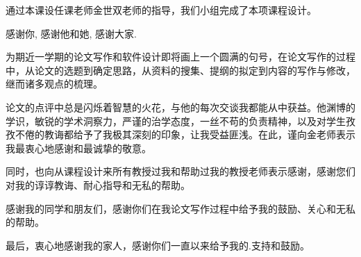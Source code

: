 
\acknowledgement
{}

通过本课设任课老师金世双老师的指导，我们小组完成了本项课程设计。

感谢你, 感谢他和她, 感谢大家.

为期近一学期的论文写作和软件设计即将画上一个圆满的句号，在论文写作的过程中，从论文的选题到确定思路，从资料的搜集、提纲的拟定到内容的写作与修改，继而诸多观点的梳理。

论文的点评中总是闪烁着智慧的火花，与他的每次交谈我都能从中获益。他渊博的学识，敏锐的学术洞察力，严谨的治学态度，一丝不苟的负责精神，以及对学生孜孜不倦的教诲都给予了我极其深刻的印象，让我受益匪浅。在此，谨向金老师表示我最衷心地感谢和最诚挚的敬意。

同时，也向从课程设计来所有教授过我和帮助过我的教授老师表示感谢，感谢您们对我的谆谆教诲、耐心指导和无私的帮助。

感谢我的同学和朋友们，感谢你们在我论文写作过程中给予我的鼓励、关心和无私的帮助。

最后，衷心地感谢我的家人，感谢你们一直以来给予我的.支持和鼓励。










